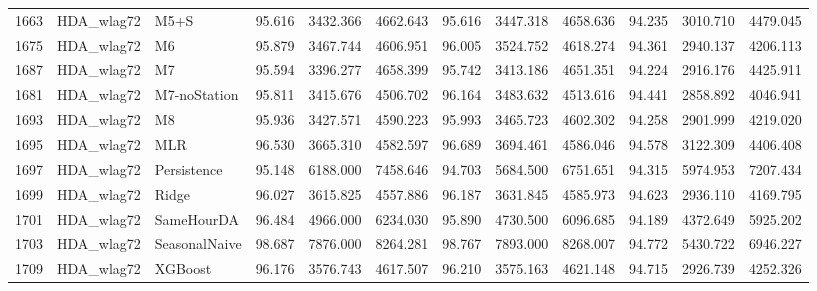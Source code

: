 \begin{tabular}{lllrrrrrrrrr}
1663 & HDA_wlag72 & M5+S & 95.616 & 3432.366 & 4662.643 & 95.616 & 3447.318 & 4658.636 & 94.235 & 3010.710 & 4479.045 \\
1675 & HDA_wlag72 & M6 & 95.879 & 3467.744 & 4606.951 & 96.005 & 3524.752 & 4618.274 & 94.361 & 2940.137 & 4206.113 \\
1687 & HDA_wlag72 & M7 & 95.594 & 3396.277 & 4658.399 & 95.742 & 3413.186 & 4651.351 & 94.224 & 2916.176 & 4425.911 \\
1681 & HDA_wlag72 & M7-noStation & 95.811 & 3415.676 & 4506.702 & 96.164 & 3483.632 & 4513.616 & 94.441 & 2858.892 & 4046.941 \\
1693 & HDA_wlag72 & M8 & 95.936 & 3427.571 & 4590.223 & 95.993 & 3465.723 & 4602.302 & 94.258 & 2901.999 & 4219.020 \\
1695 & HDA_wlag72 & MLR & 96.530 & 3665.310 & 4582.597 & 96.689 & 3694.461 & 4586.046 & 94.578 & 3122.309 & 4406.408 \\
1697 & HDA_wlag72 & Persistence & 95.148 & 6188.000 & 7458.646 & 94.703 & 5684.500 & 6751.651 & 94.315 & 5974.953 & 7207.434 \\
1699 & HDA_wlag72 & Ridge & 96.027 & 3615.825 & 4557.886 & 96.187 & 3631.845 & 4585.973 & 94.623 & 2936.110 & 4169.795 \\
1701 & HDA_wlag72 & SameHourDA & 96.484 & 4966.000 & 6234.030 & 95.890 & 4730.500 & 6096.685 & 94.189 & 4372.649 & 5925.202 \\
1703 & HDA_wlag72 & SeasonalNaive & 98.687 & 7876.000 & 8264.281 & 98.767 & 7893.000 & 8268.007 & 94.772 & 5430.722 & 6946.227 \\
1709 & HDA_wlag72 & XGBoost & 96.176 & 3576.743 & 4617.507 & 96.210 & 3575.163 & 4621.148 & 94.715 & 2926.739 & 4252.326 \\
\bottomrule
\end{tabular}
